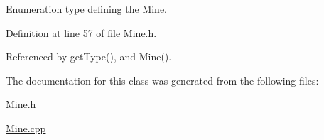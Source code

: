 Enumeration type defining the \hyperlink{classMine}{Mine}. 



Definition at line 57 of file Mine.\-h.



Referenced by get\-Type(), and Mine().



The documentation for this class was generated from the following files\-:\begin{DoxyCompactItemize}
\item 
\hyperlink{Mine_8h}{Mine.\-h}\item 
\hyperlink{Mine_8cpp}{Mine.\-cpp}\end{DoxyCompactItemize}
